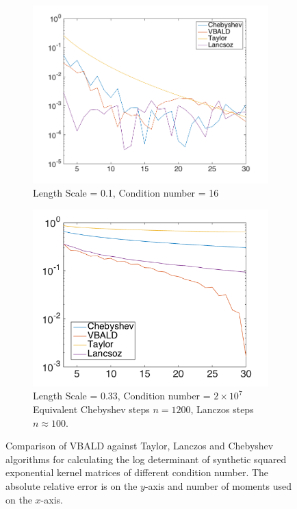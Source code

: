 \documentclass[letterpaper]{article} %
\begin{document}
\begin{figure}
	\begin{subfigure}%
		\centering
		\includegraphics[width=.8\linewidth]{propercond30dim0p1}
		\caption{Length Scale = 0.1, Condition number = 16}
		\label{fig:lscale0.1}
	\end{subfigure}
	\begin{subfigure}%
		\centering
		\includegraphics[width=.8\linewidth]{69500756condl0p33}
		\caption{Length Scale = 0.33, Condition number = $2\times 10^{7}$ Equivalent Chebyshev steps $n=1200$, Lanczos steps $n\approx 100$.}
		\label{fig:lscale0.33}
	\end{subfigure}
	\caption{Comparison of VBALD against Taylor, Lanczos and Chebyshev algorithms for calculating the log determinant of synthetic squared exponential kernel matrices of different condition number. The absolute relative error is on the $y$-axis and number of moments used on the $x$-axis.}
\end{figure}
\end{document}
